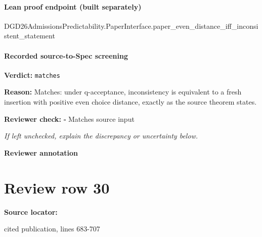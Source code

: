 \documentclass[10pt]{article}
\newcommand{\reviewerbox}{%
  \par\noindent\fbox{\parbox{0.96\linewidth}{\rule{0pt}{0.38in}}}\par
}
\newcommand{\reviewmatch}[1]{%
  \par\noindent\textbf{Reviewer check:} $\square$\; #1\par
  \noindent\emph{If left unchecked, explain the discrepancy or uncertainty below.}\par
}
\begin{document}
\paragraph{Lean proof endpoint (built separately)}\begin{ReviewVerbatim}
DGD26AdmissionsPredictability.PaperInterface.paper_even_distance_iff_inconsistent_statement
\end{ReviewVerbatim}

\paragraph{Recorded source-to-Spec screening}
\textbf{Verdict:} \texttt{matches}
\\
{\raggedright
\textbf{Reason:} Matches:\allowbreak{} under q-\allowbreak{}acceptance, inconsistency is equivalent to a fresh insertion with positive even choice distance, exactly as the source theorem states.\allowbreak{}
\par}
\reviewmatch{Matches source input}
\noindent\textbf{Reviewer annotation}\par
\reviewerbox
\clearpage
\hypertarget{source-claim-3e732abc6f7366e9}{}
\section*{Review row 30}
\textbf{Source locator:} {\footnotesize\raggedright cited publication, lines 683-\allowbreak{}707\par}
\end{document}

